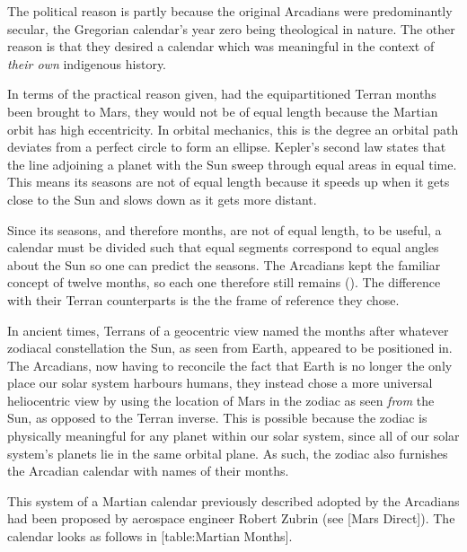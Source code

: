 The political reason is partly because the original Arcadians were predominantly secular, the Gregorian calendar's year zero being theological in nature. The other reason is that they desired a calendar which was meaningful in the context of {\it their own} indigenous history.

In terms of the practical reason given, had the equipartitioned Terran months been brought to Mars, they would not be of equal length because the Martian orbit has high eccentricity. In orbital mechanics, this is the degree an orbital path deviates from a perfect circle to form an ellipse. Kepler's second law states that the line adjoining a planet with the Sun sweep through equal areas in equal time. This means its seasons are not of equal length because it speeds up when it gets close to the Sun and slows down as it gets more distant.

Since its seasons, and therefore months, are not of equal length, to be useful, a calendar must be divided such that equal segments correspond to equal angles about the Sun so one can predict the seasons. The Arcadians kept the familiar concept of twelve months, so each one therefore still remains  (). The difference with their Terran counterparts is the the frame of reference they chose.

In ancient times, Terrans of a geocentric view named the months after whatever zodiacal constellation the Sun, as seen from Earth, appeared to be positioned in. The Arcadians, now having to reconcile the fact that Earth is no longer the only place our solar system harbours humans, they instead chose a more universal heliocentric view by using the location of Mars in the zodiac as seen {\it from} the Sun, as opposed to the Terran inverse. This is possible because the zodiac is physically meaningful for any planet within our solar system, since all of our solar system's planets lie in the same orbital plane. As such, the zodiac also furnishes the Arcadian calendar with names of their months.

This system of a Martian calendar previously described adopted by the Arcadians had been proposed by aerospace engineer Robert Zubrin (see [Mars Direct]). The calendar looks as follows in [table:Martian Months].
\crlf

